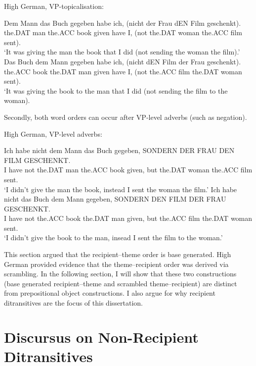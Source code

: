 \documentclass[11pt]{upenndiss}
\begin{document}
\begin{exe}
	\ex High German, VP-topicalisation:
	\begin{xlist}
		\ex \gll  Dem Mann das Buch gegeben habe ich, (nicht der Frau dEN Film geschenkt).\\
		the.DAT man the.ACC book given have I, (not the.DAT woman the.ACC film sent).\\
		\trans `It was giving the man the book that I did (not sending the woman the film).'
		\ex \gll Das Buch dem Mann gegeben habe ich, (nicht dEN Film der Frau geschenkt).\\
		the.ACC book the.DAT man given have I, (not the.ACC film the.DAT woman sent).\\
		\trans `It was giving the book to the man that I did (not sending the film to the woman).\\
	\end{xlist}
\end{exe}

Secondly, both word orders can occur after VP-level adverbs (such as negation).

\begin{exe}
	\ex High German, VP-level adverbs:
	\begin{xlist}
		\ex \gll Ich habe nicht dem Mann das Buch gegeben, SONDERN DER FRAU DEN FILM GESCHENKT.\\
		I have not the.DAT man the.ACC book given, but the.DAT woman the.ACC film sent.\\
		\trans `I didn't give the man the book, instead I sent the woman the film.'
		\ex \gll Ich habe nicht das Buch dem Mann gegeben, SONDERN DEN FILM DER FRAU GESCHENKT.\\
		I have not the.ACC book the.DAT man given, but the.ACC film the.DAT woman sent.\\
		\trans `I didn't give the book to the man, insead I sent the film to the woman.'
	\end{xlist}
\end{exe}

This section argued that the recipient--theme order is base generated. High German provided evidence that the theme--recipient order was derived via scrambling. In the following section, I will show that these two constructions (base generated recipient--theme and scrambled theme--recipient) are distinct from prepositional object constructions. I also argue for why recipient ditransitives are the focus of this dissertation.

\section{Discursus on Non-Recipient Ditransitives}
\end{document}
